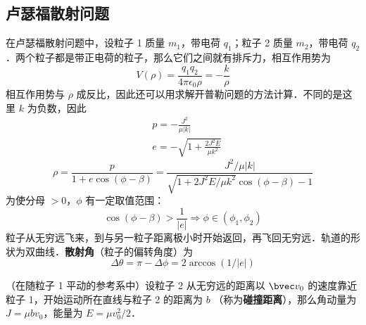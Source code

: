 \subsection{卢瑟福散射问题}
在卢瑟福散射问题中，设粒子 1 质量 $m_1$，带电荷 $q_1$；粒子 2 质量 $m_2$，带电荷 $q_2$．两个粒子都是带正电荷的粒子，那么它们之间就有排斥力，相互作用势为
\begin{equation}
V(\rho)=\frac{q_1q_2}{4\pi\epsilon_0\rho}=-\frac{k}{\rho}
\end{equation}
相互作用势与 $\rho$ 成反比，因此还可以用求解开普勒问题的方法计算．不同的是这里 $k$ 为负数，因此
\begin{equation}
\begin{aligned}
&p=-\frac{J^2}{\mu |k|}\\
&e=-\sqrt{1+\frac{2J^2E}{\mu k^2}}
\end{aligned}
\end{equation}
\begin{equation}
\rho=\frac{p}{1+e\cos(\phi-\beta)}=\frac{J^2/\mu |k|}{\sqrt{1+2J^2E/\mu k^2}\cos(\phi-\beta)-1}
\end{equation}
为使分母 $>0$，$\phi$ 有一定取值范围：
\begin{equation}
\cos(\phi-\beta)>\frac{1}{|e|}
\Rightarrow \phi \in (\phi_1,\phi_2)
\end{equation}
粒子从无穷远飞来，到与另一粒子距离极小时开始返回，再飞回无穷远．轨道的形状为双曲线．\textbf{散射角}（粒子的偏转角度）为
\begin{equation}
\Delta \theta=\pi-\Delta \phi=2\arccos(1/|e|)
\end{equation}

（在随粒子 1 平动的参考系中）设粒子 2 从无穷远的距离以 $\bvec v_0$ 的速度靠近粒子 1，开始运动所在直线与粒子 2 的距离为 $b$ （称为\textbf{碰撞距离}），那么角动量为 $J=\mu bv_0$，能量为 $E=\mu v_0^2/2$．

